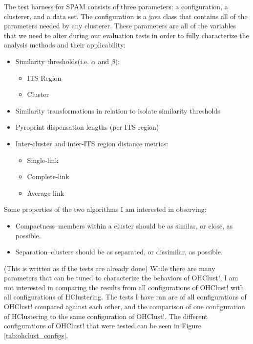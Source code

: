 \documentclass[12pt]{ucthesis}
\begin{document}
      The test harness for SPAM consists of three parameters: a configuration,
      a clusterer, and a data set. The configuration is a java class that
      contains all of the parameters needed by any clusterer. These
      parameters are all of the variables that we need to alter during our
      evaluation tests in order to fully characterize the analysis methods and
      their applicability:
      \begin{itemize}
         \item Similarity thresholds(i.e. $\alpha$ and $\beta$):
               \begin{itemize}
                  \item ITS Region
                  \item Cluster
               \end{itemize}
         \item Similarity transformations in relation to isolate similarity
               thresholds
         \item Pyroprint dispensation lengths (per ITS region)
         \item Inter-cluster and inter-ITS region distance metrics:
               \begin{itemize}
                  \item Single-link
                  \item Complete-link
                  \item Average-link
               \end{itemize}
      \end{itemize}
      Some properties of the two algorithms I am interested in observing:
      \begin{itemize}
         \item Compactness--members within a cluster should be as similar, or
               close, as possible.
         \item Separation--clusters should be as separated, or dissimilar, as
               possible.
      \end{itemize}

      (This is written as if the tests are already done) While there are many
      parameters that can be tuned to characterize the behaviors of OHClust!,
      I am not interested in comparing the results from all configurations of
      OHClust! with all configurations of HClustering. The tests I have ran are
      of all configurations of OHClust! compared against each other, and the
      comparison of one configuration of HClustering to the same configuration
      of OHClust!. The different configurations of OHClust! that were tested
      can be seen in Figure \ref{tab:ohclust_configs}.
\end{document}
